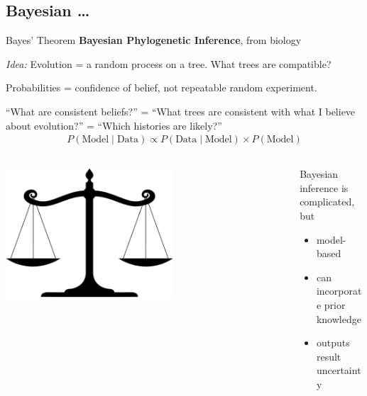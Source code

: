 \documentclass[9pt]{beamer}
\begin{document}
\subsection{Bayesian …}
\begin{frame}{Bayes' Theorem}
  \textbf{Bayesian Phylogenetic Inference}, from biology
  
  \textit{Idea:} Evolution = a random process on a tree. What trees are compatible?

  \pause
  Probabilities = confidence of belief, not repeatable random experiment.

  \pause
  “What are consistent beliefs?” = “What trees are consistent with what I believe about evolution?” = “Which histories are likely?”
  \begin{align}
    P(\text{Model} \mid \text{Data}) \propto P(\text{Data} \mid \text{Model}) \times P(\text{Model})
  \end{align}
  \begin{columns}
    \begin{column}{0.5\textwidth}
      \begin{center}
        \includegraphics[width=0.6\textwidth]{scale.png}
      \end{center}
    \end{column}
    \begin{column}{0.5\textwidth}
      \pause
      Bayesian inference is complicated, but
      \begin{itemize}
      \item model-based
      \item can incorporate prior knowledge
      \item outputs result uncertainty
      \end{itemize}
    \end{column}
  \end{columns}
\end{frame}
\end{document}
